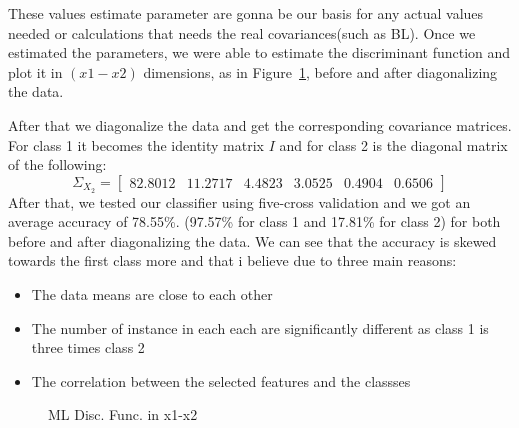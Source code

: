 \documentclass[11pt, oneside]{article}   	%
\begin{document}
These values estimate parameter are gonna be our basis for any actual values needed or calculations that needs the real covariances(such as BL).
Once we estimated the parameters, we were able to estimate the discriminant function and plot it in $(x1-x2)$ dimensions, as in Figure~\ref{fig:ml-disc-func}, before and after diagonalizing the data.

After that we diagonalize the data and get the corresponding covariance matrices. For class 1 it becomes the identity matrix $I$ and for class 2 is the diagonal matrix of the following:
$$\Sigma_{X_2} = \begin{bmatrix}
  82.8012 & 11.2717 & 4.4823 & 3.0525 & 0.4904 & 0.6506
\end{bmatrix}$$
After that, we tested our classifier using five-cross validation and we got an average accuracy of 78.55\%. (97.57\% for class 1 and 17.81\% for class 2) for both before and after diagonalizing the data. We can see that the accuracy is skewed towards the first class more and that i believe due to three main reasons:
\begin{itemize}
	\item The data means are close to each other
	\item The number of instance in each each are significantly different as class 1 is three times class 2
	\item The correlation between the selected features and the classses
\end{itemize}

\begin{figure}
\begin{center}
\end{center}
\caption{ML Disc. Func. in x1-x2}
\label{fig:ml-disc-func}
\end{figure}
\end{document}
